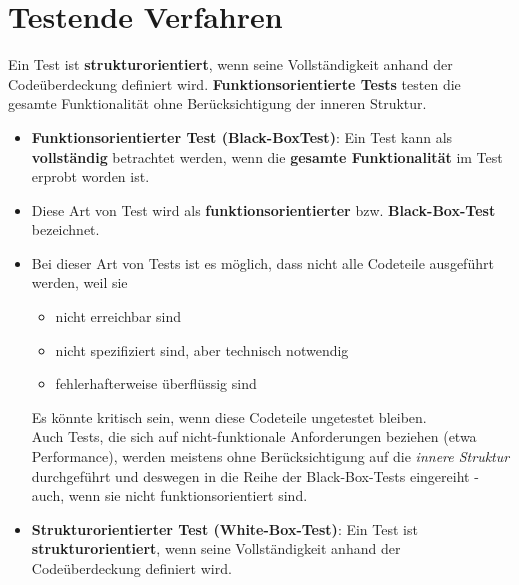 \section{Testende Verfahren}

\begin{tcolorbox}[title=Strukturorientierte und funktionsorientierte Tests]
    Ein Test ist \textbf{strukturorientiert}, wenn seine Vollständigkeit anhand der Codeüberdeckung definiert wird.  \textbf{Funktionsorientierte Tests} testen die gesamte Funktionalität ohne Berücksichtigung der inneren Struktur.\\

    \begin{itemize}
        \item \textbf{Funktionsorientierter Test (Black-BoxTest)}: Ein Test kann als \textbf{vollständig} betrachtet werden, wenn die \textbf{gesamte Funktionalität} im Test erprobt worden ist.
        \item[] Diese Art von Test wird als \textbf{funktionsorientierter} bzw. \textbf{Black-Box-Test} bezeichnet.
        \item[] Bei dieser Art von Tests ist es möglich, dass nicht alle Codeteile ausgeführt werden, weil sie
        \begin{itemize}
            \item nicht erreichbar sind
            \item nicht spezifiziert sind, aber technisch notwendig
            \item fehlerhafterweise überflüssig sind
        \end{itemize}
        \noindent
        Es könnte kritisch sein, wenn diese Codeteile ungetestet bleiben.\\
        Auch Tests, die sich auf nicht-funktionale Anforderungen beziehen (etwa Performance), werden meistens ohne Berücksichtigung auf die \textit{innere Struktur} durchgeführt und deswegen in die Reihe der Black-Box-Tests eingereiht - auch, wenn sie nicht funktionsorientiert sind.
        \item \textbf{Strukturorientierter Test (White-Box-Test)}: Ein Test ist \textbf{strukturorientiert}, wenn seine Vollständigkeit anhand der Codeüberdeckung definiert wird.
    \end{itemize}
\end{tcolorbox}